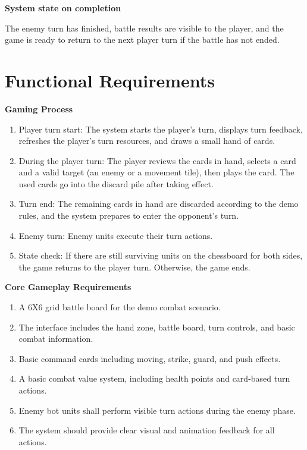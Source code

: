 \documentclass[12pt,a4paper]{report}
\begin{document}
\textbf{System state on completion}

The enemy turn has finished, battle results are visible to the player, and the game is ready to return to the next player turn if the battle has not ended.

\section{Functional Requirements}

\textbf{Gaming Process}

\begin{enumerate}
\item Player turn start: The system starts the player's turn, displays turn feedback, refreshes the player's turn resources, and draws a small hand of cards.
\item During the player turn: The player reviews the cards in hand, selects a card and a valid target (an enemy or a movement tile), then plays the card. The used cards go into the discard pile after taking effect.
\item Turn end: The remaining cards in hand are discarded according to the demo rules, and the system prepares to enter the opponent's turn.
\item Enemy turn: Enemy units execute their turn actions.
\item State check: If there are still surviving units on the chessboard for both sides, the game returns to the player turn. Otherwise, the game ends.
\end{enumerate}

\textbf{Core Gameplay Requirements}

\begin{enumerate}
\item A 6X6 grid battle board for the demo combat scenario.
\item The interface includes the hand zone, battle board, turn controls, and basic combat information.
\item Basic command cards including moving, strike, guard, and push effects.
\item A basic combat value system, including health points and card-based turn actions.
\item Enemy bot units shall perform visible turn actions during the enemy phase.
\item The system should provide clear visual and animation feedback for all actions.
\end{enumerate}
\end{document}
